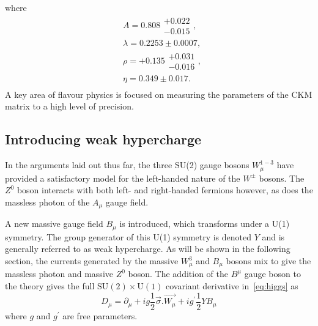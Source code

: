 where 
\begin{equation}
  \begin{split} 
    &A = 0.808\substack{+0.022\\-0.015}, \\
    & \lambda = 0.2253\pm 0.0007,  \\
    & \rho =+ 0.135\substack{+0.031\\-0.016}, \\
    &\eta = 0.349\pm0.017 .\\
    \end{split}
\end{equation}
A key area of flavour physics is focused on measuring the parameters of the CKM matrix to a high level of precision.

\subsection{Introducing weak hypercharge}
In the arguments laid out thus far, the three SU(2) gauge bosons $W^{1-3}_{\mu}$ have provided a satisfactory model for the left-handed nature of the $W^{\pm}$ bosons. The $Z^{0}$ boson interacts with both left- and right-handed fermions however, as does the massless photon of the $A_{\mu}$ gauge field.

A new massive gauge field $B_{\mu}$ is introduced, which transforms under a U(1) symmetry. The group generator of this U(1) symmetry is denoted $Y$ and is generally referred to as weak hypercharge. As will be shown in the following section, the currents generated by the massive $W^{3}_{\mu}$ and $B_{\mu}$ bosons mix to give the massless photon and massive $Z^{0}$ boson. %
The addition of the $B^{\mu}$ gauge boson to the theory gives the full $\mathrm{SU(2)\times U(1)}$ covariant derivative in~\autoref{eq:higgs} as 
\begin{equation}
  D_{\mu} = \partial_{\mu}+ig\frac{1}{2}\vec{\sigma}.\vec{W_{\mu}} + ig^{'}\frac{1}{2}YB_{\mu}
  \label{eq:higgscodev}
\end{equation}
where $g$ and $g^{\prime}$ are free parameters.
